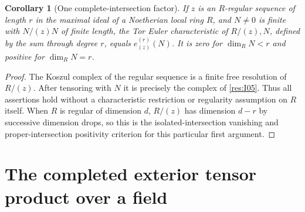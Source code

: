 \documentclass[11pt,oneside,openany]{book}
\newtheorem{corollary}[theorem]{Corollary}
\theoremstyle{definition}
\theoremstyle{remark}
\begin{document}
\begin{corollary}[One complete-intersection factor]\label{res:I06}
If \(z\) is an \(R\)-regular sequence of length \(r\) in the maximal
ideal of a Noetherian local ring \(R\), and \(N\ne 0\) is finite
with \(N/(z)N\) of finite length, the Tor Euler characteristic
of \(R/(z),N\), defined by the sum through degree \(r\), equals
\(e^{(r)}_{(z)}(N)\).
It is zero for \(\dim_R N<r\) and positive for \(\dim_R N=r\).
\end{corollary}
\begin{proof}
The Koszul complex of the regular sequence is a finite free
resolution of \(R/(z)\). \cite[Chapter 5]{core}
After tensoring with \(N\) it is precisely the complex of
\ref{res:I05}. Thus all assertions hold without a characteristic
restriction or regularity assumption on \(R\) itself. When \(R\)
is regular of dimension \(d\), \(R/(z)\) has dimension \(d-r\) by
successive dimension drops, so this is the isolated-intersection
vanishing and proper-intersection positivity criterion for this
particular first argument.
\end{proof}

\section{The completed exterior tensor product over a field}
\end{document}
